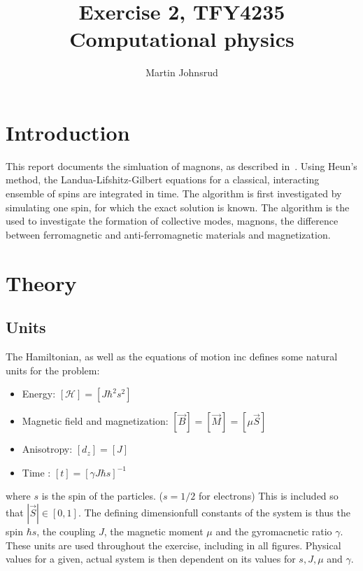 \documentclass{article}
\title{Exercise 2, TFY4235 Computational physics}
\author{Martin Johnsrud}
\date{}
\begin{document}
    \maketitle
    \section*{Introduction}
    This report documents the simluation of magnons, as described in~\cite{exercise}. Using Heun's method, the Landua-Lifshitz-Gilbert equations for a classical, interacting ensemble of spins are integrated in time. The algorithm is first investigated by simulating one spin, for which the exact solution is known. The algorithm is the used to investigate the formation of collective modes, magnons, the difference between ferromagnetic and anti-ferromagnetic materials and magnetization. 

    \section*{Theory}
    \subsection*{Units}
    The Hamiltonian, as well as the equations of motion inc \cite{exercise} defines some natural units for the problem: 
    \begin{itemize}
        \item Energy: $[\mathcal H] = [J \hbar^2 s^2]$
        \item Magnetic field and magnetization: $[\vec B] = [\vec M] = [\mu \vec S ]$
        \item Anisotropy: $[d_z] = [J]$
        \item Time : $[t] = [\gamma J \hbar s]^{-1}$
    \end{itemize}
     where $s$ is the spin of the particles. ($s=1/2$ for electrons) This is included so that $|\vec S|\in[0, 1]$. The defining dimensionfull constants of the system is thus the spin $\hbar s$, the coupling $J$, the magnetic moment $\mu$ and the gyromacnetic ratio $\gamma$. These units are used throughout the exercise, including in all figures. Physical values for a given, actual system is then dependent on its values for $s, J, \mu$ and $\gamma$.
\end{document}
